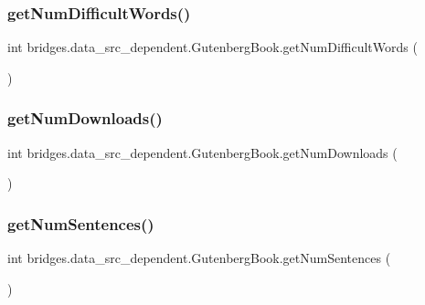 \subsubsection{\texorpdfstring{get\+Num\+Difficult\+Words()}{getNumDifficultWords()}}
{\footnotesize\ttfamily int bridges.\+data\+\_\+src\+\_\+dependent.\+Gutenberg\+Book.\+get\+Num\+Difficult\+Words (\begin{DoxyParamCaption}{ }\end{DoxyParamCaption})}

\hypertarget{classbridges_1_1data__src__dependent_1_1_gutenberg_book_ab15136957384a78824d9a1bccdc41fd5}{}\label{classbridges_1_1data__src__dependent_1_1_gutenberg_book_ab15136957384a78824d9a1bccdc41fd5} 
\subsubsection{\texorpdfstring{get\+Num\+Downloads()}{getNumDownloads()}}
{\footnotesize\ttfamily int bridges.\+data\+\_\+src\+\_\+dependent.\+Gutenberg\+Book.\+get\+Num\+Downloads (\begin{DoxyParamCaption}{ }\end{DoxyParamCaption})}

\hypertarget{classbridges_1_1data__src__dependent_1_1_gutenberg_book_a0d42fd351ee8b2861e43b6c4aad2bca1}{}\label{classbridges_1_1data__src__dependent_1_1_gutenberg_book_a0d42fd351ee8b2861e43b6c4aad2bca1} 
\subsubsection{\texorpdfstring{get\+Num\+Sentences()}{getNumSentences()}}
{\footnotesize\ttfamily int bridges.\+data\+\_\+src\+\_\+dependent.\+Gutenberg\+Book.\+get\+Num\+Sentences (\begin{DoxyParamCaption}{ }\end{DoxyParamCaption})}

